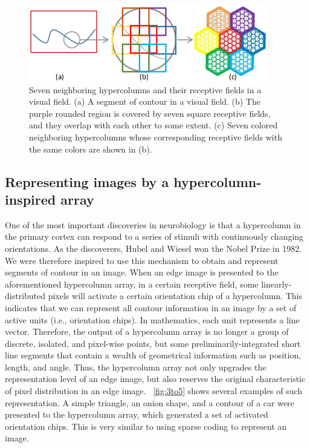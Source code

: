 \documentclass[journal]{IEEEtran}
\begin{document}
\begin{figure}[!t]
\centering
\includegraphics[width=0.8\linewidth]{images/fig2.png}
\caption{Seven neighboring hypercolumns and their receptive fields in a visual field. 
(a) A segment of contour in a visual field. 
(b) The purple rounded region is covered by seven square receptive fields, 
and they overlap with each other to some extent. 
(c) Seven colored neighboring hypercolumns whose corresponding receptive fields with the same colors 
are shown in (b).}
\label{fig:2}
\end{figure}

\subsection{Representing images by a hypercolumn-inspired array}

One of the most important discoveries in neurobiology is that a hypercolumn in the primary cortex can respond to a series of stimuli with continuously changing orientations. 
As the discoverers, Hubel and Wiesel won the Nobel Prize in 1982. 
We were therefore inspired to use this mechanism to obtain and represent segments of contour in an image. 
When an edge image is presented to the aforementioned hypercolumn array, 
in a certain receptive field, 
some linearly-distributed pixels will activate a certain orientation chip of a hypercolumn. 
This indicates that we can represent all contour information in an image by a set of active units (i.e., orientation chips). In mathematics, each unit represents a line vector. Therefore, the output of a hypercolumn array is no longer a group of discrete, isolated, and pixel-wise points, 
but some preliminarily-integrated short line segments that contain a wealth of geometrical information such as position, length, and angle. 
Thus, the hypercolumn array not only upgrades the representation level of an edge image, 
but also reserves the original characteristic of pixel distribution in an edge image. 
\figurename~\ref{fig:3to5} shows several examples of such representation.
A simple triangle, an onion shape, and a contour of a car were presented to the hypercolumn array,
which generated a set of activated orientation chips.
This is very similar to using sparse coding to represent an image.
\end{document}

